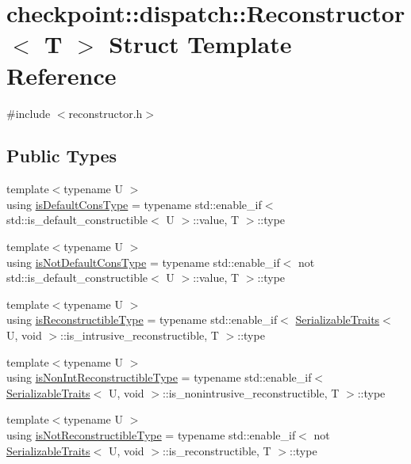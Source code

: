 \hypertarget{structcheckpoint_1_1dispatch_1_1_reconstructor}{}\section{checkpoint\+:\+:dispatch\+:\+:Reconstructor$<$ T $>$ Struct Template Reference}
\label{structcheckpoint_1_1dispatch_1_1_reconstructor}


{\ttfamily \#include $<$reconstructor.\+h$>$}

\subsection*{Public Types}
\begin{DoxyCompactItemize}
\item 
{\footnotesize template$<$typename U $>$ }\\using \hyperlink{structcheckpoint_1_1dispatch_1_1_reconstructor_ae91135a7a24b1008e7f184271fbc35d8}{is\+Default\+Cons\+Type} = typename std\+::enable\+\_\+if$<$ std\+::is\+\_\+default\+\_\+constructible$<$ U $>$\+::value, T $>$\+::type
\item 
{\footnotesize template$<$typename U $>$ }\\using \hyperlink{structcheckpoint_1_1dispatch_1_1_reconstructor_a0062e5edfdd87b34c3e5464d1f1020ec}{is\+Not\+Default\+Cons\+Type} = typename std\+::enable\+\_\+if$<$ not std\+::is\+\_\+default\+\_\+constructible$<$ U $>$\+::value, T $>$\+::type
\item 
{\footnotesize template$<$typename U $>$ }\\using \hyperlink{structcheckpoint_1_1dispatch_1_1_reconstructor_a37f3875f054a494315bf3a577346073d}{is\+Reconstructible\+Type} = typename std\+::enable\+\_\+if$<$ \hyperlink{structcheckpoint_1_1_serializable_traits}{Serializable\+Traits}$<$ U, void $>$\+::is\+\_\+intrusive\+\_\+reconstructible, T $>$\+::type
\item 
{\footnotesize template$<$typename U $>$ }\\using \hyperlink{structcheckpoint_1_1dispatch_1_1_reconstructor_a522861d587505c7fbe63d5a7a913b298}{is\+Non\+Int\+Reconstructible\+Type} = typename std\+::enable\+\_\+if$<$ \hyperlink{structcheckpoint_1_1_serializable_traits}{Serializable\+Traits}$<$ U, void $>$\+::is\+\_\+nonintrusive\+\_\+reconstructible, T $>$\+::type
\item 
{\footnotesize template$<$typename U $>$ }\\using \hyperlink{structcheckpoint_1_1dispatch_1_1_reconstructor_a36da09eb87ef3c1b45c0cdba27895f72}{is\+Not\+Reconstructible\+Type} = typename std\+::enable\+\_\+if$<$ not \hyperlink{structcheckpoint_1_1_serializable_traits}{Serializable\+Traits}$<$ U, void $>$\+::is\+\_\+reconstructible, T $>$\+::type

\end{DoxyCompactItemize}
